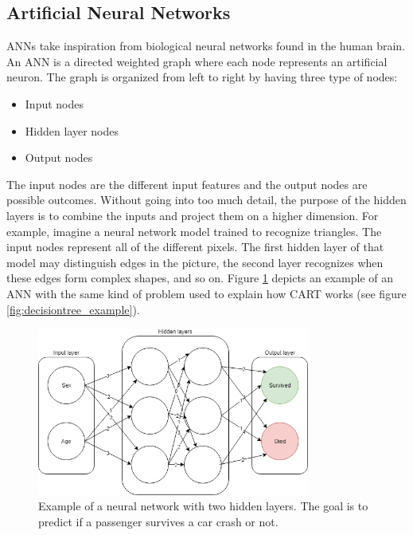 	\subsection{Artificial Neural Networks} \label{sec:deep_learning}
			ANNs take inspiration from biological neural networks found in the human brain. An ANN is a directed weighted graph where each node represents an artificial neuron. The graph is organized from left to right by having three type of nodes:
	\begin{itemize}
		\item Input nodes
		\item Hidden layer nodes
		\item Output nodes
	\end{itemize}
			The input nodes are the different input features and the output nodes are possible outcomes. Without going into too much detail, the purpose of the hidden layers is to combine the inputs and project them on a higher dimension. For example, imagine a neural network model trained to recognize triangles. The input nodes represent all of the different pixels. The first hidden layer of that model may distinguish edges in the picture, the second layer recognizes when these edges form complex shapes, and so on. Figure \ref{fig:neuralnetwork_example} depicts an example of an ANN with the same kind of problem used to explain how CART works (see figure  \ref{fig:decisiontree_example}).

\begin{figure}[H] 
	\centering
	\includegraphics[width=0.8\textwidth]{media/neuralnetwork_ex.png}
	\caption{Example of a neural network with two hidden layers. The goal is to predict if a passenger survives a car crash or not.}
	\label{fig:neuralnetwork_example}
\end{figure}

